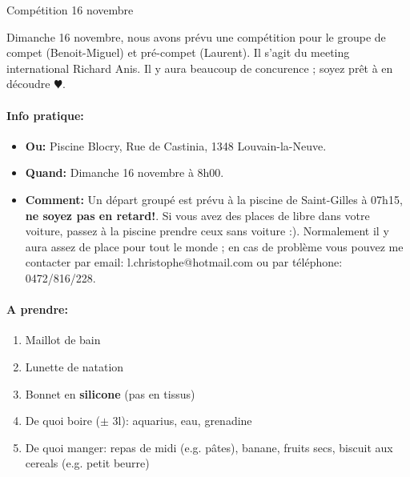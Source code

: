 \documentclass{article}
\begin{document}
\begin{center}\huge{Compétition 16 novembre}\end{center}
\hspace{1cm}

Dimanche 16 novembre, nous avons prévu une compétition pour le groupe de compet (Benoit-Miguel) et pré-compet (Laurent).
Il s'agit du meeting international Richard Anis. Il y aura beaucoup de concurence ; soyez prêt à en découdre $\varheartsuit$.

\paragraph{Info pratique:}
\begin{itemize}
\item \textbf{Ou:} Piscine Blocry, Rue de Castinia, 1348 Louvain-la-Neuve.
\item \textbf{Quand:} Dimanche 16 novembre à 8h00.
\item \textbf{Comment:} Un départ groupé est prévu à la piscine de Saint-Gilles à 07h15, \textbf{ne soyez pas en retard!}. Si vous avez des places de libre dans votre voiture, passez à la piscine prendre ceux sans voiture :). Normalement il y aura assez de place pour tout le monde ; en cas de problème vous pouvez me contacter par email: l.christophe@hotmail.com ou par téléphone: 0472/816/228.
\end{itemize}

\paragraph{A prendre:}
\begin{enumerate}
\item Maillot de bain
\item Lunette de natation
\item Bonnet en \textbf{silicone} (pas en tissus)
\item De quoi boire ($\pm$ 3l): aquarius, eau, grenadine
\item De quoi manger: repas de midi (e.g. pâtes), banane, fruits secs, biscuit aux cereals (e.g. petit beurre)
\end{enumerate}
\end{document}
